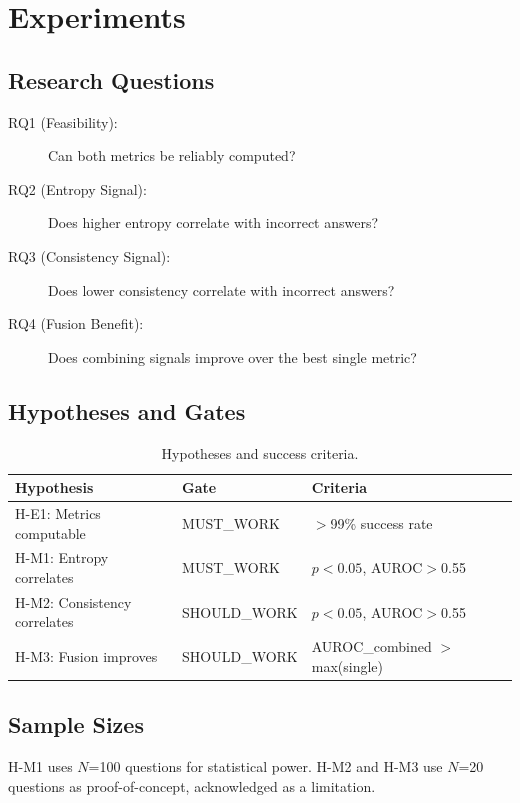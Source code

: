 \section{Experiments}

\subsection{Research Questions}

\begin{description}
    \item[RQ1 (Feasibility):] Can both metrics be reliably computed?
    \item[RQ2 (Entropy Signal):] Does higher entropy correlate with incorrect answers?
    \item[RQ3 (Consistency Signal):] Does lower consistency correlate with incorrect answers?
    \item[RQ4 (Fusion Benefit):] Does combining signals improve over the best single metric?
\end{description}

\subsection{Hypotheses and Gates}

\begin{table}[h]
\centering
\begin{tabular}{llp{4cm}}
\toprule
Hypothesis & Gate & Criteria \\
\midrule
H-E1: Metrics computable & MUST\_WORK & $>$99\% success rate \\
H-M1: Entropy correlates & MUST\_WORK & $p<0.05$, AUROC$>$0.55 \\
H-M2: Consistency correlates & SHOULD\_WORK & $p<0.05$, AUROC$>$0.55 \\
H-M3: Fusion improves & SHOULD\_WORK & AUROC\_combined $>$ max(single) \\
\bottomrule
\end{tabular}
\caption{Hypotheses and success criteria.}
\label{tab:hypotheses}
\end{table}

\subsection{Sample Sizes}

H-M1 uses $N$=100 questions for statistical power. H-M2 and H-M3 use $N$=20 questions as proof-of-concept, acknowledged as a limitation.
